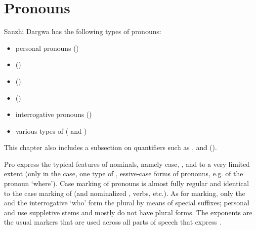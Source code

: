 \chapter{Pronouns}
\label{cpt:pronouns}




Sanzhi Dargwa has the following types of pronouns:
%
\begin{itemize}
	\item	personal pronouns ()
	\item	{} ()
	\item	{} ()
	\item	{} ()
	\item	interrogative pronouns ()
	\item	various types of  ( and )
\end{itemize}
%
This chapter also includes a subsection on quantifiers such as ,  and  (). 

Pro express the typical features of nominals, namely case, , and to a very limited extent  (only  in the  case, one type of , essive-case forms of pronouns, e.g. of the pronoun `where'). Case marking of pronouns is almost fully regular and identical to the case marking of  (and nominalized , verbs, etc.). As for  marking, only the  and the interrogative `who' form the plural by means of special suffixes; personal and  use suppletive stems and  mostly do not have plural forms. The  exponents are the usual markers that are used across all parts of speech that express .


